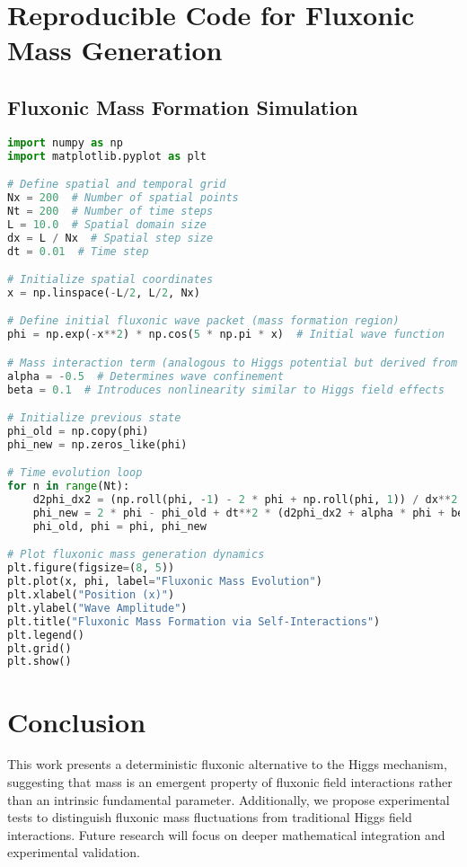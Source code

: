 \documentclass{article}
\begin{document}
\section{Reproducible Code for Fluxonic Mass Generation}
\subsection{Fluxonic Mass Formation Simulation}
\begin{lstlisting}[language=Python]
import numpy as np
import matplotlib.pyplot as plt

# Define spatial and temporal grid
Nx = 200  # Number of spatial points
Nt = 200  # Number of time steps
L = 10.0  # Spatial domain size
dx = L / Nx  # Spatial step size
dt = 0.01  # Time step

# Initialize spatial coordinates
x = np.linspace(-L/2, L/2, Nx)

# Define initial fluxonic wave packet (mass formation region)
phi = np.exp(-x**2) * np.cos(5 * np.pi * x)  # Initial wave function

# Mass interaction term (analogous to Higgs potential but derived from fluxonic interactions)
alpha = -0.5  # Determines wave confinement
beta = 0.1  # Introduces nonlinearity similar to Higgs field effects

# Initialize previous state
phi_old = np.copy(phi)
phi_new = np.zeros_like(phi)

# Time evolution loop
for n in range(Nt):
    d2phi_dx2 = (np.roll(phi, -1) - 2 * phi + np.roll(phi, 1)) / dx**2
    phi_new = 2 * phi - phi_old + dt**2 * (d2phi_dx2 + alpha * phi + beta * phi**3)
    phi_old, phi = phi, phi_new

# Plot fluxonic mass generation dynamics
plt.figure(figsize=(8, 5))
plt.plot(x, phi, label="Fluxonic Mass Evolution")
plt.xlabel("Position (x)")
plt.ylabel("Wave Amplitude")
plt.title("Fluxonic Mass Formation via Self-Interactions")
plt.legend()
plt.grid()
plt.show()
\end{lstlisting}

\section{Conclusion}
This work presents a deterministic fluxonic alternative to the Higgs mechanism, suggesting that mass is an emergent property of fluxonic field interactions rather than an intrinsic fundamental parameter. Additionally, we propose experimental tests to distinguish fluxonic mass fluctuations from traditional Higgs field interactions. Future research will focus on deeper mathematical integration and experimental validation.
\end{document}
